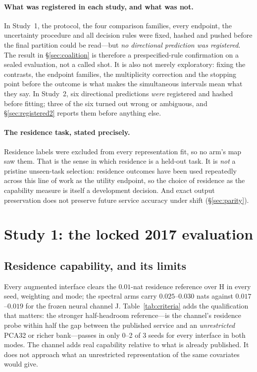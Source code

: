 \documentclass[10pt]{article}
\begin{document}
\paragraph{What was registered in each study, and what was not.} In Study~1, the protocol, the four
comparison families, every endpoint, the uncertainty procedure and all decision rules were fixed,
hashed and pushed before the final partition could be read---but \emph{no directional prediction
was registered}. The result in \S\ref{sec:coalition} is therefore a prespecified-rule confirmation
on a sealed evaluation, not a called shot. It is also not merely exploratory: fixing the contrasts,
the endpoint families, the multiplicity correction and the stopping point before the outcome is
what makes the simultaneous intervals mean what they say. In Study~2, six directional predictions
\emph{were} registered and hashed before fitting; three of the six turned out wrong or ambiguous,
and \S\ref{sec:registered2} reports them before anything else.

\paragraph{The residence task, stated precisely.} Residence labels were excluded from every
representation fit, so no arm's map saw them. That is the sense in which residence is a held-out
task. It is \emph{not} a pristine unseen-task selection: residence outcomes have been used
repeatedly across this line of work as the utility endpoint, so the choice of residence as the
capability measure is itself a development decision. And exact output preservation does not
preserve future service accuracy under shift (\S\ref{sec:parity}).

\section{Study 1: the locked 2017 evaluation}
\label{sec:results1}

\subsection{Residence capability, and its limits}

Every augmented interface clears the $0.01$-nat residence reference over H in every seed, weighting
and mode; the spectral arms carry $0.025$--$0.030$ nats against $0.017$--$0.019$ for the frozen
neural channel J. Table~\ref{tab:criteria} adds the qualification that matters: the stronger
half-headroom reference---is the channel's residence probe within half the gap between the
published service and an \emph{unrestricted} PCA32 or richer bank---passes in only 0--2 of 3 seeds
for every interface in both modes. The channel adds real capability relative to what is already
published. It does not approach what an unrestricted representation of the same covariates would
give.
\end{document}
